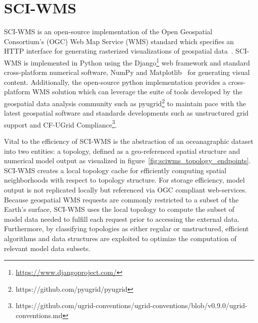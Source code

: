 \documentclass[11pt,twocolumn,twoside]{IEEEtran}
\newcommand{\ogc}{OGC}
\newcommand{\wms}{WMS}
\newcommand{\sciwms}{SCI-WMS}
\newcommand{\Sciwms}{SCI-WMS}
\begin{document}
\section{\sciwms{}}
\Sciwms{} is an open-source implementation of the Open Geospatial
Consortium's (\ogc{}) Web Map Service (\wms{}) standard which
specifies an HTTP interface for generating rasterized visualizations
of geospatial data~\cite{wms14}. \sciwms{} is implemented in Python
using the Django\footnote{\url{https://www.djangoproject.com/}} web
framework and standard cross-platform numerical software, NumPy and
Matplotlib~\cite{numpy11, hunter07} for generating visual
content. Additionally, the open-source python implementation provides
a cross-platform \wms{} solution which can leverage the suite of tools
developed by the geospatial data analysis community such as
pyugrid\footnote{https://github.com/pyugrid/pyugrid} to maintain pace
with the latest geospatial software and standards developments such as
unstructured grid support and CF-UGrid
Compliance\footnote{https://github.com/ugrid-conventions/ugrid-conventions/blob/v0.9.0/ugrid-conventions.md}.

Vital to the efficiency of \sciwms{} is the abstraction
of an oceanagraphic dataset into two entities: a topology, defined as
a geo-referenced spatial structure and numerical model output as
visualized in figure~\ref{fig:sciwms_topology_endpoints}. \Sciwms{}
creates a local topology cache for efficiently computing spatial
neighborhoods with respect to topology structure.  For storage
efficiency, model output is not replicated locally but referenced via
OGC compliant web-services. Because geospatial \wms{} requests are
commonly restricted to a subset of the Earth's surface, \sciwms{} uses
the local topology to compute the subset of model data needed to
fulfill each request prior to accessing the external
data. Furthermore, by classifying topologies as either regular or
unstructured, efficient algorithms and data structures are exploited
to optimize the computation of relevant model data subsets.
\end{document}
